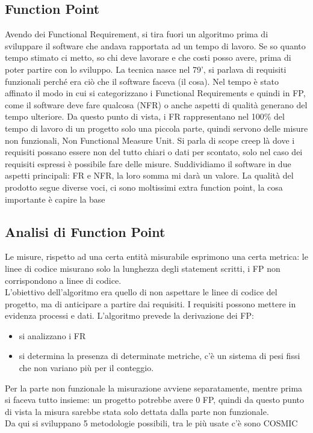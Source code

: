 \documentclass{article}
\begin{document}
\subsection{Function Point}
Avendo dei Functional Requirement, si tira fuori un algoritmo prima di sviluppare il software che andava rapportata ad un tempo di lavoro. Se so quanto tempo stimato ci metto, so chi deve lavorare e che costi posso avere, prima di poter partire con lo sviluppo. La tecnica nasce nel 79', si parlava di requisiti funzionali perché era ciò che il software faceva (il cosa). Nel tempo è stato affinato il modo in cui si categorizzano i Functional Requirements e quindi in FP, come il software deve fare qualcosa (NFR) o anche aspetti di qualità generano del tempo ulteriore. Da questo punto di vista, i FR rappresentano nel 100\% del tempo di lavoro di un progetto solo una piccola parte, quindi servono delle misure non funzionali, Non Functional Measure Unit. Si parla di scope creep là dove i requisiti possano essere non del tutto chiari o dati per scontato, solo nel caso dei requisiti espressi è possibile fare delle misure. Suddividiamo il software in due aspetti principali: FR e NFR, la loro somma mi darà un valore. La qualità del prodotto segue diverse voci, ci sono moltissimi extra function point, la cosa importante è capire la base
\subsection{Analisi di Function Point}
Le misure, rispetto ad una certa entità misurabile esprimono una certa metrica: le linee di codice misurano solo la lunghezza degli statement scritti, i FP non corrispondono a linee di codice.\\ L'obiettivo dell'algoritmo era quello di non aspettare le linee di codice del progetto, ma di anticipare a partire dai requisiti. I requisiti possono mettere in evidenza processi e dati. L'algoritmo prevede la derivazione dei FP:
\begin{itemize}
\item si analizzano i FR
\item si determina la presenza di determinate metriche, c'è un sistema di pesi fissi che non variano più per il conteggio.
\end{itemize}
Per la parte non funzionale la misurazione avviene separatamente, mentre prima si faceva tutto insieme: un progetto potrebbe avere 0 FP, quindi da questo punto di vista la misura sarebbe stata solo dettata dalla parte non funzionale.\\ Da qui si sviluppano 5 metodologie possibili, tra le più usate c'è sono COSMIC
\end{document}
